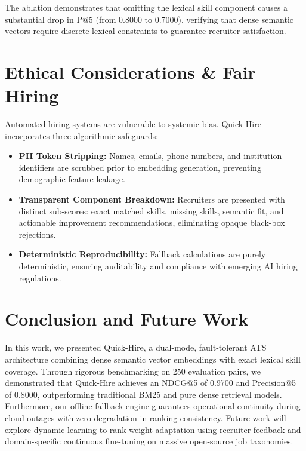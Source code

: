 \documentclass[conference]{IEEEtran}
\begin{document}
The ablation demonstrates that omitting the lexical skill component causes a substantial drop in P@5 (from 0.8000 to 0.7000), verifying that dense semantic vectors require discrete lexical constraints to guarantee recruiter satisfaction.

\section{Ethical Considerations \& Fair Hiring}
Automated hiring systems are vulnerable to systemic bias. Quick-Hire incorporates three algorithmic safeguards:
\begin{itemize}
    \item \textbf{PII Token Stripping:} Names, emails, phone numbers, and institution identifiers are scrubbed prior to embedding generation, preventing demographic feature leakage.
    \item \textbf{Transparent Component Breakdown:} Recruiters are presented with distinct sub-scores: exact matched skills, missing skills, semantic fit, and actionable improvement recommendations, eliminating opaque black-box rejections.
    \item \textbf{Deterministic Reproducibility:} Fallback calculations are purely deterministic, ensuring auditability and compliance with emerging AI hiring regulations.
\end{itemize}

\section{Conclusion and Future Work}
In this work, we presented Quick-Hire, a dual-mode, fault-tolerant ATS architecture combining dense semantic vector embeddings with exact lexical skill coverage. Through rigorous benchmarking on 250 evaluation pairs, we demonstrated that Quick-Hire achieves an NDCG@5 of 0.9700 and Precision@5 of 0.8000, outperforming traditional BM25 and pure dense retrieval models. Furthermore, our offline fallback engine guarantees operational continuity during cloud outages with zero degradation in ranking consistency. Future work will explore dynamic learning-to-rank weight adaptation using recruiter feedback and domain-specific continuous fine-tuning on massive open-source job taxonomies.



\end{document}
